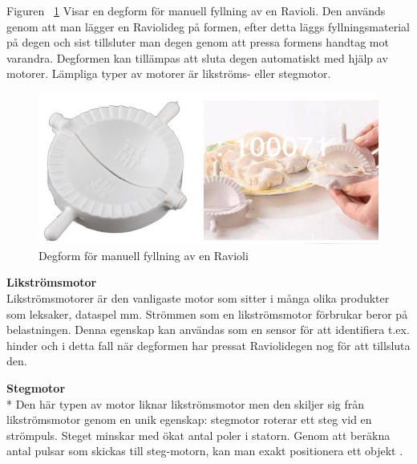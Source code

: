 Figuren ~\ref{degform} Visar en degform för manuell fyllning av en Ravioli. Den används genom att man lägger en Raviolideg på formen, efter detta läggs fyllningsmaterial på degen och sist tillsluter man degen genom att pressa formens handtag mot varandra. Degformen kan tillämpas att sluta degen automatiskt med hjälp av motorer. Lämpliga typer av motorer  är likströms- eller stegmotor.\\

\begin{figure}[h]
	\begin{center}
		\includegraphics[scale=0.75]{images/ravioli_mould_trimed_1.jpg}
		\caption{Degform för manuell fyllning av en Ravioli}
		\label{degform}
	\end{center}
\end{figure}
\textbf{Likströmsmotor}\\
Likströmsmotorer är den vanligaste motor som sitter i många olika produkter som leksaker, dataspel mm\cite{likstromsmotor}. Strömmen som en likströmsmotor förbrukar beror på belastningen. Denna egenskap kan användas som en sensor för att identifiera t.ex. hinder och i detta fall när degformen har pressat Raviolidegen nog för att tillsluta den.

\textbf{Stegmotor}\\*
Den här typen av motor liknar likströmsmotor men den skiljer sig från likströmsmotor genom en unik egenskap: stegmotor roterar ett steg vid en strömpuls. Steget minskar med ökat antal poler i statorn. Genom att beräkna antal pulsar som skickas till steg-motorn, kan man exakt positionera ett objekt \cite{stegmotor}.
